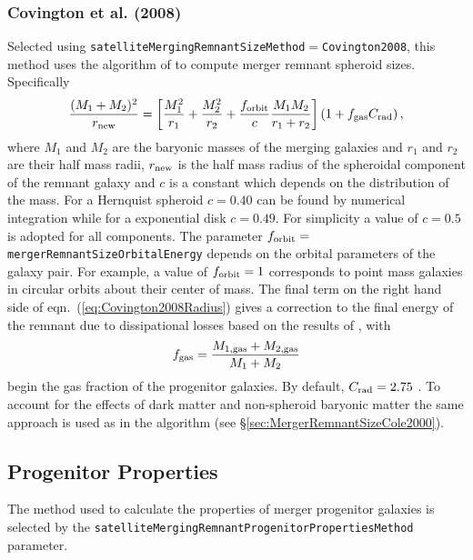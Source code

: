 \subsubsection{Covington et al. (2008)}

Selected using {\tt satelliteMergingRemnantSizeMethod}$=${\tt Covington2008}, this method uses the algorithm of \cite{covington_predicting_2008} to compute merger remnant spheroid sizes. Specifically
\begin{equation}
\frac{(M_1+M_2)^2}{ r_{\rm new}} =
\left[ \frac{M_1^2}{r_1} + \frac{M_2^2}{r_2} + \frac{ f_{\rm orbit}}{c}
\frac{M_1 M_2}{r_1+r_2}\right] \left( 1 + f_{\rm gas} C_{\rm rad} \right),
\label{eq:Covington2008Radius}
\end{equation}
where $M_1$ and $M_2$ are the baryonic masses of the merging galaxies and $r_1$
and $r_2$ are their half mass radii, $r_{\rm new}$ is the half mass radius of the spheroidal component of the remnant galaxy and $c$ is a constant which depends on the distribution of the mass. For a Hernquist spheroid $c=0.40$ can be found by numerical integration while for a exponential disk $c=0.49$. For simplicity a value of $c=0.5$ is adopted for all components. The parameter $f_{\rm orbit}=${\tt mergerRemnantSizeOrbitalEnergy} depends on the orbital parameters of the galaxy pair. For example, a value of $f_{\rm orbit} = 1$ corresponds to point mass galaxies in circular orbits about their center of mass. The final term on the right hand side of eqn.~(\ref{eq:Covington2008Radius}) gives a correction to the final energy of the remnant due to dissipational losses based on the results of \cite{covington_effects_2011}, with
\begin{equation}
 f_{\rm gas} = {M_{\rm 1,gas}+M_{\rm 2,gas} \over M_1+M_2}
\end{equation}
begin the gas fraction of the progenitor galaxies. By default, $C_{\rm rad}=2.75$ \citep{covington_effects_2011}. To account for the effects of dark matter and non-spheroid baryonic matter the same approach is used as in the \cite{cole_hierarchical_2000} algorithm (see \S\ref{sec:MergerRemnantSizeCole2000}). 

\subsection{Progenitor Properties}

The method used to calculate the properties of merger progenitor galaxies is selected by the {\tt satelliteMergingRemnantProgenitorPropertiesMethod} parameter.

